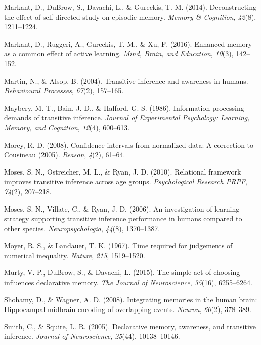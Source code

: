 \documentclass[floatsintext,man]{apa6}
\theoremstyle{definition}
\theoremstyle{definition}
\theoremstyle{definition}
\theoremstyle{remark}
\begin{document}
\hypertarget{ref-markant2014deconstructing}{}
Markant, D., DuBrow, S., Davachi, L., \& Gureckis, T. M. (2014).
Deconstructing the effect of self-directed study on episodic memory.
\emph{Memory \& Cognition}, \emph{42}(8), 1211--1224.

\hypertarget{ref-markant2016enhanced}{}
Markant, D., Ruggeri, A., Gureckis, T. M., \& Xu, F. (2016). Enhanced
memory as a common effect of active learning. \emph{Mind, Brain, and
Education}, \emph{10}(3), 142--152.

\hypertarget{ref-martin2004transitive}{}
Martin, N., \& Alsop, B. (2004). Transitive inference and awareness in
humans. \emph{Behavioural Processes}, \emph{67}(2), 157--165.

\hypertarget{ref-maybery1986information}{}
Maybery, M. T., Bain, J. D., \& Halford, G. S. (1986).
Information-processing demands of transitive inference. \emph{Journal of
Experimental Psychology: Learning, Memory, and Cognition}, \emph{12}(4),
600--613.

\hypertarget{ref-morey2008confidence}{}
Morey, R. D. (2008). Confidence intervals from normalized data: A
correction to Cousineau (2005). \emph{Reason}, \emph{4}(2), 61--64.

\hypertarget{ref-moses2010relational}{}
Moses, S. N., Ostreicher, M. L., \& Ryan, J. D. (2010). Relational
framework improves transitive inference across age groups.
\emph{Psychological Research PRPF}, \emph{74}(2), 207--218.

\hypertarget{ref-moses2006investigation}{}
Moses, S. N., Villate, C., \& Ryan, J. D. (2006). An investigation of
learning strategy supporting transitive inference performance in humans
compared to other species. \emph{Neuropsychologia}, \emph{44}(8),
1370--1387.

\hypertarget{ref-moyer1967time}{}
Moyer, R. S., \& Landauer, T. K. (1967). Time required for judgements of
numerical inequality. \emph{Nature}, \emph{215}, 1519--1520.

\hypertarget{ref-murty2015simple}{}
Murty, V. P., DuBrow, S., \& Davachi, L. (2015). The simple act of
choosing influences declarative memory. \emph{The Journal of
Neuroscience}, \emph{35}(16), 6255--6264.

\hypertarget{ref-shohamy2008integrating}{}
Shohamy, D., \& Wagner, A. D. (2008). Integrating memories in the human
brain: Hippocampal-midbrain encoding of overlapping events.
\emph{Neuron}, \emph{60}(2), 378--389.

\hypertarget{ref-smith2005declarative}{}
Smith, C., \& Squire, L. R. (2005). Declarative memory, awareness, and
transitive inference. \emph{Journal of Neuroscience}, \emph{25}(44),
10138--10146.
\end{document}
